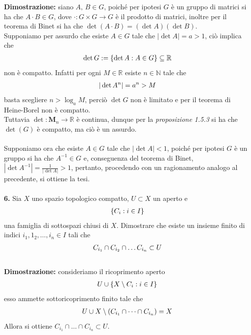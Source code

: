 \documentclass{article}
\begin{document}
\textbf{Dimostrazione:} siano $A,\, B \in G$, poiché per ipotesi $G$ è un gruppo di matrici si ha che $A \cdot B \in G$, dove $\cdot : G \times G \longrightarrow G$ è il prodotto di matrici, inoltre per il teorema di Binet si ha che $\det (A \cdot B) = (\det A)(\det B)$. \\
Supponiamo per assurdo che esiste $A \in G$ tale che $|\det A| = a > 1$, ciò implica che
\begin{gather}
    \det G := \{ \det A : A \in G \} \subseteq \mathbb{R} \notag
\end{gather}
non è compatto. Infatti per ogni $M \in \mathbb{R}$ esiste $n \in \mathbb{N}$ tale che
\begin{gather}
    |\det A^n| = a^n > M \notag
\end{gather}
basta scegliere $n > \log_a M$, perciò $\det G$ non è limitato e per il teorema di Heine-Borel non è compatto. \\
Tuttavia $\det : \mathbf{M}_n \longrightarrow \mathbb{R}$ è continua, dunque per la \textit{proposizione 1.5.3} si ha che $\det(G)$ è compatto, ma ciò è un assurdo. \\ \\
Supponiamo ora che esiste $A \in G$ tale che $|\det A| < 1$, poiché per ipotesi $G$ è un gruppo si ha che $A^{-1} \in G$ e, conseguenza del teorema di Binet, $|\det A^{-1}| = \frac{1}{|\det A|} > 1$, pertanto, procedendo con un ragionamento analogo al precedente, si ottiene la tesi. \\ \\
\textbf{6.} Sia $X$ uno spazio topologico compatto, $U \subset X$ un aperto e
\begin{gather}
    \{ C_i : i \in I \} \notag
\end{gather}
una famiglia di sottospazi chiusi di $X$. Dimostrare che esiste un insieme finito di indici $i_1, 1_2, \dots, i_n \in I$ tali che
\begin{gather}
    C_{i_1} \cap C_{i_2} \cap \dots C_{i_n} \subset U \notag
\end{gather} \\

\textbf{Dimostrazione:} consideriamo il ricoprimento aperto
\begin{gather}
    U \cup \{ X \setminus C_i : i \in I \} \notag
\end{gather}
esso ammette sottoricoprimento finito tale che
\begin{gather}
    U \cup X \setminus (C_{i_1} \cap \dots \cap C_{i_n}) = X \notag
\end{gather}
Allora si ottiene $C_{i_1} \cap \dots \cap C_{i_n} \subset U$.
\end{document}
